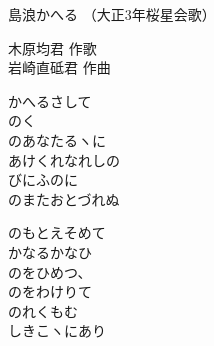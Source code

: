 \documentclass[10pt,b5j]{tarticle} %
\begin{document}
\begin{minipage}[c]{0.7\hsize} %
    \begin{center}
        {\LARGE
            島浪かへる %
        }
        {\small 
            （大正3年桜星会歌） %
        }
    \end{center}
\end{minipage}
\begin{minipage}[c]{0.3\hsize} %
    \begin{flushright} %
        木原均君 作歌\\岩崎直砥君 作曲 %
    \end{flushright}
\end{minipage}

\vspace{1.5em} %
\newcommand{\linespace}{0.5em} %
\newcommand{\blocksize}{0.5\hsize} %
\begin{enumerate} %
    \begin{minipage}[c]{\blocksize}
    
        \vspace{\linespace}
        \item
        かへるさして\\
        のく\\
        のあなたるヽに\\
        あけくれなれしの\\
        びにふのに\\
        のまたおとづれぬ
        
        \vspace{\linespace}
        \item
        のもとえそめて\\
        かなるかなひ\\
        のをひめつ、\\
        のをわけりて\\
        のれくもむ\\
        しきこヽにあり
    
    \end{minipage}
\end{enumerate} %
\end{document}
